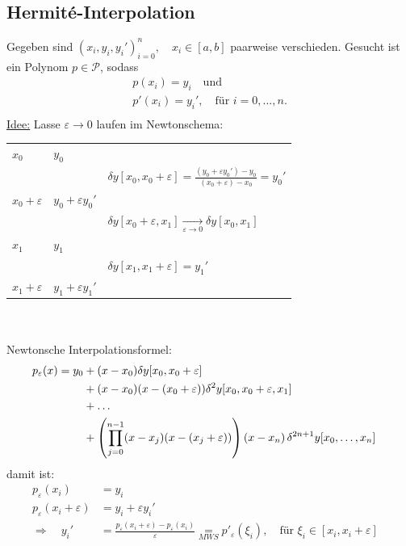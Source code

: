 \documentclass[12pt]{article}
\theoremstyle{break}
\begin{document}
\subsection{Hermit\'{e}-Interpolation}

Gegeben sind $(x_i, y_i, y_i')_{i=0}^n, \quad x_i \in [a,b]$ paarweise verschieden. Gesucht ist ein Polynom $p \in \mathcal{P}$, sodass
\begin{align*}
&p(x_i) = y_i \quad \text{und } &\\
&p'(x_i) = y_i', \quad \text{für } i=0,...,n. &\\
\end{align*}
\underline{Idee:} Lasse $\varepsilon \rightarrow 0$ laufen im Newtonschema:

\begin{tabular}{lll}
 
$x_0$ & $y_0$\\
 & & $\delta y[x_0, x_0+\varepsilon] = \frac{(y_0 + \varepsilon y_0') - y_0}{(x_0 +\varepsilon) - x_0} = y_0'$\\
$x_0+\varepsilon$ & $y_0 + \varepsilon y_0'$\\
 & & $\delta y[x_0+\varepsilon, x_1] \underset{\varepsilon \rightarrow 0}{\rightarrow} \delta y[x_0,x_1]$\\
$x_1$ & $y_1$\\
 & & $\delta y[x_1, x_1+\varepsilon] = y_1'$\\
$x_1+\varepsilon$ & $y_1+\varepsilon y_1'$\\
 
\end{tabular} \\ \\
Newtonsche Interpolationsformel:
\begin{align*}
p_{\varepsilon}(x) = y_0 &+ (x-x_0) \delta y[x_0, x_0+\varepsilon] &\\
&+ (x-x_0)(x-(x_0 + \varepsilon)) \delta^2y[x_0, x_0 + \varepsilon, x_1] &\\
&+ \dots &\\
&+ \left( \prod_{j=0}^{n-1} (x-x_j)(x-(x_j + \varepsilon))\right)(x-x_n) \thinspace \delta^{2n+1} y[x_0,\dots, x_n]
\end{align*}
damit ist:
\begin{align*}
p_{\varepsilon}(x_i) &= y_i &\\
p_{\varepsilon}(x_i + \varepsilon) &= y_i + \varepsilon y_i' &\\
\Rightarrow \quad y_i' &= \frac{p_{\varepsilon}(x_i + \varepsilon) - p_{\varepsilon}(x_i)}{\varepsilon} \underset{MWS}{=} p'_{\varepsilon}(\xi_i), \quad \text{für } \xi_i \in [x_i, x_i+\varepsilon]
\end{align*}
\end{document}
